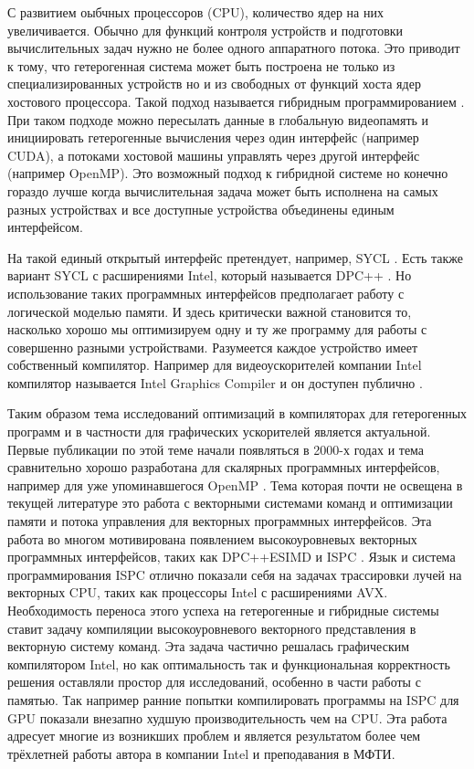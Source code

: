 С развитием оыбчных процессоров (CPU), количество ядер на них увеличивается. Обычно для функций контроля устройств и подготовки вычислительных задач нужно не более одного аппаратного потока. Это приводит к тому, что гетерогенная система может быть построена не только из специализированных устройств но и из свободных от функций хоста ядер хостового процессора. Такой подход называется гибридным программированием \cite{yang2017hybrid}. При таком подходе можно пересылать данные в глобальную видеопамять и инициировать гетерогенные вычисления через один интерфейс (например CUDA), а потоками хостовой машины управлять через другой интерфейс (например OpenMP). Это возможный подход к гибридной системе но конечно гораздо лучше когда вычислительная задача может быть исполнена на самых разных устройствах и все доступные устройства объединены единым интерфейсом.

На такой единый открытый интерфейс претендует, например, SYCL \cite{da2016comparative}. Есть также вариант SYCL с расширениями Intel, который называется DPC++ \cite{reinders2021dpc}. Но использование таких программных интерфейсов предполагает работу с логической моделью памяти. И здесь критически важной становится то, насколько хорошо мы оптимизируем одну и ту же программу для работы с совершенно разными устройствами. Разумеется каждое устройство имеет собственный компилятор. Например для видеоускорителей компании Intel компилятор называется Intel Graphics Compiler и он доступен публично \cite{chandrasekhar2019igc}.

Таким образом тема исследований оптимизаций в компиляторах для гетерогенных программ и в частности для графических ускорителей является актуальной. Первые публикации по этой теме начали появляться в 2000-х годах \cite{yang2010gpgpu} и тема сравнительно хорошо разработана для скалярных программных интерфейсов, например для уже упоминавшегося OpenMP \cite{lee2009openmp}. Тема которая почти не освещена в текущей литературе это работа с векторными системами команд и оптимизации памяти и потока управления для векторных программных интерфейсов. Эта работа во многом мотивирована появлением высокоуровневых векторных программных интерфейсов, таких как DPC++ESIMD и ISPC \cite{pharr2012ispc}. Язык и система программирования ISPC отлично показали себя на задачах трассировки лучей на векторных CPU, таких как процессоры Intel с расширениями AVX. Необходимость переноса этого успеха на гетерогенные и гибридные системы ставит задачу компиляции высокоуровневого векторного представления в векторную систему команд. Эта задача частично решалась графическим компилятором Intel, но как оптимальность так и функциональная корректность решения оставляли простор для исследований, особенно в части работы с памятью. Так например ранние попытки компилировать программы на ISPC для GPU показали внезапно худшую производительность чем на CPU. Эта работа адресует многие из возникших проблем и является результатом более чем трёхлетней работы автора в компании Intel и преподавания в МФТИ.

